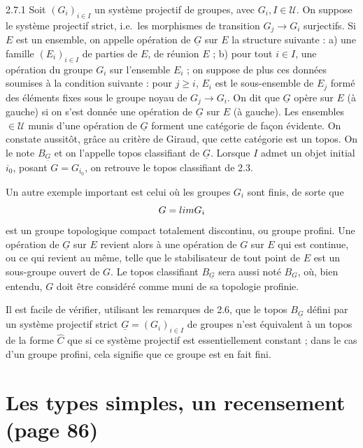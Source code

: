 \documentclass[11pt,a4paper]{article}
\begin{document}
2.7.1 Soit  $(G_{i})_{i \in I}$ un système projectif
 de groupes, avec $G_{i}, I \in \mathcal{U}$. On suppose le
système projectif strict, i.e.\ les morphismes de transition
$G_{j} \to G_{i}$ surjectifs. Si $E$ est un ensemble, on
 appelle opération de
$\underline{G}$ sur $E$  la structure suivante :
a) une famille $(E_{i})_{i \in I}$ de parties de $E$, de réunion $E$ ;
b) pour tout $i \in I$, une opération du groupe $G_{i}$ sur l'ensemble
$E_{i}$ ; on suppose de plus ces données soumises à la condition suivante :
pour $j \geq i$, $E_{i}$ est le sous-ensemble de $E_{j}$ formé des éléments
fixes sous le groupe noyau de $G_{j} \to G_{i}$. On dit  que
$\underline{G}$ opère sur $E$ (à gauche) si on s'est donnée une opération de
$\underline{G}$ sur $E$ (à gauche). Les ensembles $\in \mathcal{U}$ munis
d'une opération de $\underline{G}$ forment une catégorie de façon évidente.
On constate aussitôt, grâce au critère de Giraud, que cette catégorie est un
topos. On le note $B_{\underline{G}}$ et on l'appelle
topos classifiant de $\underline{G}$. Lorsque $I$ admet un objet
\struck{\ill{}} initial $i_{0}$, posant $G = G_{i_{0}}$, on retrouve le topos
classifiant de 2.3.

 Un autre exemple important est celui où les groupes $G_{i}$ sont
finis, de sorte que
\[
G = \varprojlim G_{i}
\]
est un groupe topologique compact totalement discontinu, ou groupe profini.
Une opération de $\underline{G}$ sur $E$ revient alors à une opération de $G$
sur $E$ qui est continue, ou ce qui revient au même, telle que le
stabilisateur de tout point de $E$ est un sous-groupe ouvert de $G$. Le topos
classifiant $B_{\underline{G}}$ sera aussi noté $B_{G}$, où, bien entendu,
$G$ doit être considéré comme muni de sa topologie profinie.

 Il est facile de vérifier,  utilisant les remarques de
2.6, que le topos $B_{\underline{G}}$ défini par un système projectif strict
 $\underline{G} = (G_{i})_{i \in I}$ de groupes n'est équivalent à
un topos de la forme $\hat{C}$ que si ce système projectif est essentiellement
constant ; dans le cas d'un groupe profini, cela signifie que ce groupe est en
fait fini.

\section*{Les types simples, un recensement (page 86)}
\end{document}
